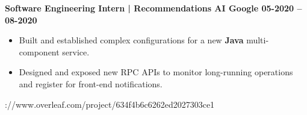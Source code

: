 \textbf{Software Engineering Intern | Recommendations AI \hspace{-10mm} \hfill Google \hfill  05-2020 -- 08-2020}\par

\begin{itemize}
        \item Built and established complex configurations for a new \textbf{Java} multi-component service.
        \item Designed and exposed new RPC APIs to monitor long-running operations and register for front-end notifications.
\end{itemize}\parhttps://www.overleaf.com/project/634f4b6c6262ed2027303ce1